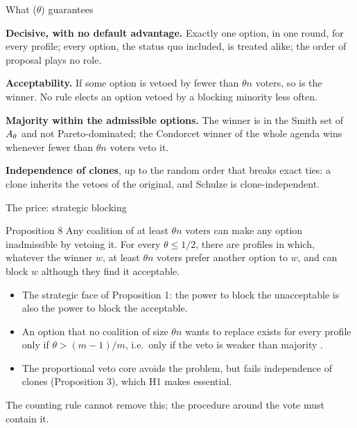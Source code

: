 \documentclass[10pt,aspectratio=169]{beamer}
\begin{document}
\begin{frame}{What \QVC($\theta$) guarantees}
  \begin{description}[Prop. 4]
    \item[Prop.\ 4] \textbf{Decisive, with no default advantage.} Exactly one option, in one round, for
      every profile; every option, the status quo included, is treated alike; the order of proposal
      plays no role.
    \item[Prop.\ 5] \textbf{Acceptability.} If some option is vetoed by fewer than $\theta n$ voters, so is
      the winner. No rule elects an option vetoed by a blocking minority less often.
    \item[Prop.\ 6] \textbf{Majority within the admissible options.} The winner is in the Smith set of
      $A_\theta$ and not Pareto-dominated; the Condorcet winner of the whole agenda wins whenever fewer than
      $\theta n$ voters veto it.
    \item[Prop.\ 7] \textbf{Independence of clones}, up to the random order that breaks exact ties:
      a clone inherits the vetoes of the original, and Schulze is clone-independent.
  \end{description}
  \medskip
\end{frame}

\begin{frame}{The price: strategic blocking}
  \begin{block}{Proposition 8}
    Any coalition of at least $\theta n$ voters can make any option inadmissible by vetoing it. For every
    $\theta \le 1/2$, there are profiles in which, whatever the winner $w$, at least $\theta n$ voters prefer
    another option to $w$, and can block $w$ although they find it acceptable.
  \end{block}
  \begin{itemize}
    \item The strategic face of Proposition 1: the power to block the unacceptable is also the power to
      block the acceptable.
    \item An option that no coalition of size $\theta n$ wants to replace exists for every profile only if
      $\theta > (m-1)/m$, i.e.\ only if the veto is weaker than majority .
    \item The proportional veto core avoids the problem, but fails independence of clones
      (Proposition 3), which H1 makes essential.
  \end{itemize}
  \alert{The counting rule cannot remove this; the procedure around the vote must contain it.}
\end{frame}
\end{document}
